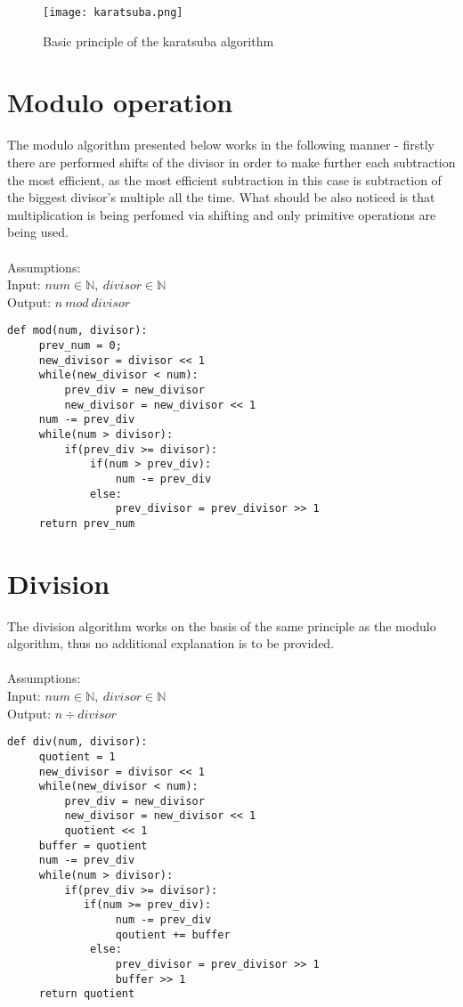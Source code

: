 \documentclass{report}
\begin{document}
\begin{figure}
  \centering
  \texttt{[image: karatsuba.png]}
  \caption{Basic principle of the karatsuba algorithm}
  \label{figure: 1}
\end{figure}

\section{Modulo operation}
The modulo algorithm presented below works in the following manner - firstly there are performed shifts of the divisor in order to make further each subtraction the most efficient, as the most efficient subtraction in this case is subtraction of the biggest divisor's multiple all the time. What should be also noticed is that multiplication is being perfomed via shifting and only primitive operations are being used.\\ \\
Assumptions:\\
Input: $num \in\mathbb{N},\: divisor\in\mathbb{N}$\\
Output: $n\: mod\: divisor $\\
\begin{lstlisting}[caption=Modulo algorithm]
def mod(num, divisor):
     prev_num = 0;  
     new_divisor = divisor << 1
     while(new_divisor < num):
         prev_div = new_divisor 
         new_divisor = new_divisor << 1 
     num -= prev_div 
     while(num > divisor): 
         if(prev_div >= divisor):
             if(num > prev_div):
                 num -= prev_div 
             else:
                 prev_divisor = prev_divisor >> 1
     return prev_num
\end{lstlisting}
\section{Division}
The division algorithm works on the basis of the same principle as the modulo algorithm, thus no additional explanation is to be provided.\\ \\
Assumptions:\\
Input: $num \in\mathbb{N},\: divisor\in\mathbb{N}$\\
Output: $n \div divisor$ \\
\begin{lstlisting}[caption=Division algorithm]
def div(num, divisor):
     quotient = 1
     new_divisor = divisor << 1
     while(new_divisor < num):  
         prev_div = new_divisor 
         new_divisor = new_divisor << 1 
         quotient << 1 
     buffer = quotient 
     num -= prev_div 
     while(num > divisor): 
         if(prev_div >= divisor):
            if(num >= prev_div):
                 num -= prev_div 
                 qoutient += buffer 
             else:
                 prev_divisor = prev_divisor >> 1
                 buffer >> 1
     return quotient 
\end{lstlisting}
\end{document}
